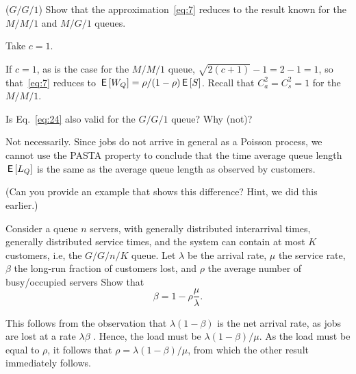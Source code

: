 \begin{exercise}($G/G/1$)
  Show that the approximation~\eqref{eq:7} reduces to the result known for the $M/M/1$ and $M/G/1$ queues.
  \begin{hint}
 Take $c=1$.
  \end{hint}
  \begin{solution}
    If $c=1$, as is the case for the $M/M/1$ queue, $\sqrt{2(c+1)} - 1=2-1=1$, so that~\eqref{eq:7} reduces to $\,\mathsf{E}\left[W_Q\right] = \rho/(1-\rho) \,\mathsf{E}\left[S\right]$. Recall that $C_a^2=C_s^2=1$ for the $M/M/1$. 
  \end{solution}
\end{exercise}





\begin{exercise}
  Is Eq.~\eqref{eq:24} also valid for the $G/G/1$ queue? Why (not)?
  \begin{solution}
    Not necessarily. Since jobs do not arrive in general as a Poisson
    process, we cannot use the PASTA property to conclude that the
    time average queue length $\,\mathsf{E}\left[L_Q\right]$ is the same as the average
    queue length as observed by customers.

(Can you provide an example that shows this difference?
    Hint, we did this earlier.)
  \end{solution}
\end{exercise}



\begin{exercise}
  Consider a queue $n$ servers, with generally distributed
  interarrival times, generally distributed service times, and the
  system can contain at most $K$ customers, i.e, the $G/G/n/K$ queue.
  Let $\lambda$ be the arrival rate, $\mu$ the service rate, $\beta$
  the long-run fraction of customers lost, and $\rho$  the average
  number of busy/occupied servers
  Show that 
  \begin{equation*}
    \beta = 1 - \rho\frac{\mu}{\lambda}.
  \end{equation*}
\begin{solution}
  This follows from the observation that $\lambda(1-\beta)$ is the net
  arrival rate, as jobs are lost at a rate $\lambda\beta$ . Hence, the
  load must be $\lambda(1-\beta)/\mu$. As the load must be equal to
  $\rho$, it follows that $\rho = \lambda(1-\beta)/\mu$, from which the
  other result immediately follows.
\end{solution}
\end{exercise}

